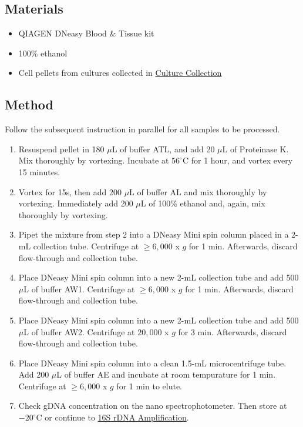 \documentclass[onecolumn]{article}
\begin{document}
\subsection{Materials}
\begin{itemize}
  \item QIAGEN DNeasy Blood \& Tissue kit
  \item 100\% ethanol
  \item Cell pellets from cultures collected in \hyperref[CC]{Culture Collection}
\end{itemize}

\subsection{Method}
Follow the subsequent instruction in parallel for all samples to be processed.
\begin{enumerate}
  \item Resuspend pellet in 180 $\mu$L of buffer ATL, and add 20 $\mu$L of Proteinase K. Mix thoroughly by vortexing. Incubate at $56^\circ$C for 1 hour, and vortex every 15 minutes.
  \item Vortex for 15s, then add 200 $\mu$L of buffer AL and mix thoroughly by vortexing. Immediately add 200 $\mu$L of 100\% ethanol and, again, mix thoroughly by vortexing.
  \item Pipet the mixture from step 2 into a DNeasy Mini spin column placed in a 2-mL collection tube. Centrifuge at $\geq 6,000$ x $g$ for 1 min. Afterwards, discard flow-through and collection tube.
  \item Place DNeasy Mini spin column into a new 2-mL collection tube and add 500 $\mu$L of buffer AW1. Centrifuge at $\geq 6,000$ x $g$ for 1 min. Afterwards, discard flow-through and collection tube.
  \item Place DNeasy Mini spin column into a new 2-mL collection tube and add 500 $\mu$L of buffer AW2. Centrifuge at $20,000$ x $g$ for 3 min. Afterwards, discard flow-through and collection tube.
  \item Place DNeasy Mini spin column into a clean 1.5-mL microcentrifuge tube. Add 200 $\mu$L of buffer AE and incubate at room tempurature for 1 min. Centrifuge at $\geq 6,000$ x $g$ for 1 min to elute.
  \item Check gDNA concentration on the nano spectrophotometer. Then store at $-20^\circ$C or continue to \hyperref[1rA]{16S rDNA Amplification}.
\end{enumerate}
\end{document}
